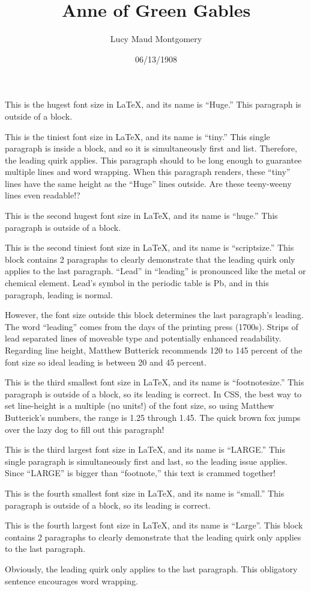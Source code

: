 \documentclass[a4paper]{article}
\title{Anne of Green Gables}
\author{Lucy Maud Montgomery}
\date{06/13/1908}
\begin{document}
\maketitle

\Huge This is the hugest font size in LaTeX, and its name is ``Huge.'' This paragraph is outside of a block.

{\tiny This is the tiniest font size in LaTeX, and its name is ``tiny.'' This single paragraph is inside a block, and so it is simultaneously first and list. Therefore, the leading quirk applies. This paragraph should to be long enough to guarantee multiple lines and word wrapping. When this paragraph renders, these ``tiny'' lines have the same height as the ``Huge'' lines outside. Are these teeny-weeny lines even readable!?}

\huge This is the second hugest font size in LaTeX, and its name is ``huge.'' This paragraph is outside of a block.

{\scriptsize This is the second tiniest font size in LaTeX, and its name is ``scriptsize.'' This block contains 2 paragraphs to clearly demonstrate that the leading quirk only applies to the last paragraph. ``Lead'' in ``leading'' is pronounced like the metal or chemical element. Lead's symbol in the periodic table is Pb, and in this paragraph, leading is normal.

However, the font size outside this block determines the last paragraph's leading. The word ``leading'' comes from the days of the printing press (1700s). Strips of lead separated lines of moveable type and potentially enhanced readability. Regarding line height, Matthew Butterick recommends 120 to 145 percent of the font size so ideal leading is between 20 and 45 percent.}

\footnotesize This is the third smallest font size in LaTeX, and its name is ``footnotesize.'' This paragraph is outside of a block, so its leading is correct. In CSS, the best way to set line-height is a multiple (no units!) of the font size, so using Matthew Butterick's numbers, the range is 1.25 through 1.45. The quick brown fox jumps over the lazy dog to fill out this paragraph!

{\LARGE This is the third largest font size in LaTeX, and its name is ``LARGE.'' This single paragraph is simultaneously first and last, so the leading issue applies. Since ``LARGE'' is bigger than ``footnote,'' this text is crammed together!}

\small This is the fourth smallest font size in LaTeX, and its name is ``small.'' This paragraph is outside of a block, so its leading is correct.

{\Large This is the fourth largest font size in LaTeX, and its name is ``Large''. This block contains 2 paragraphs to clearly demonstrate that the leading quirk only applies to the last paragraph.

Obviously, the leading quirk only applies to the last paragraph. This obligatory sentence encourages word wrapping.}
\end{document}
